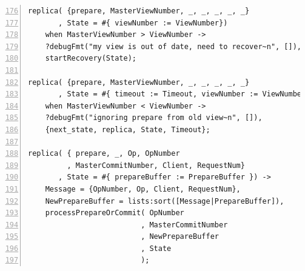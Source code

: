 \documentclass[10pt,letter]{article}
\begin{document}
\begin{lstlisting}[float,caption=The \texttt{gen\_fsm} Behavior --- \texttt{vr.erl},
                   label=lst:genfsm, numbers=left, firstnumber=176]
replica( {prepare, MasterViewNumber, _, _, _, _, _}
       , State = #{ viewNumber := ViewNumber})
    when MasterViewNumber > ViewNumber ->
    ?debugFmt("my view is out of date, need to recover~n", []),
    startRecovery(State);

replica( {prepare, MasterViewNumber, _, _, _, _, _}
       , State = #{ timeout := Timeout, viewNumber := ViewNumber})
    when MasterViewNumber < ViewNumber ->
    ?debugFmt("ignoring prepare from old view~n", []),
    {next_state, replica, State, Timeout};

replica( { prepare, _, Op, OpNumber
         , MasterCommitNumber, Client, RequestNum}
       , State = #{ prepareBuffer := PrepareBuffer }) ->
    Message = {OpNumber, Op, Client, RequestNum},
    NewPrepareBuffer = lists:sort([Message|PrepareBuffer]),
    processPrepareOrCommit( OpNumber
                          , MasterCommitNumber
                          , NewPrepareBuffer
                          , State
                          );
\end{lstlisting}
\end{document}

